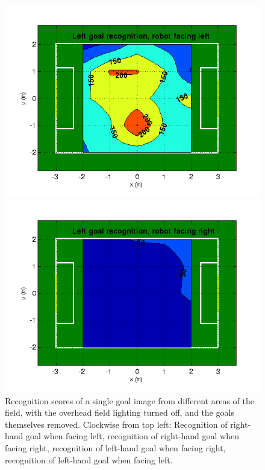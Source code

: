 \documentclass[runningheads,a4paper]{llncs}
\begin{document}
\begin{figure} [h]
\begin{minipage}[b]{0.5\textwidth}
\includegraphics[width=1\textwidth]{figures/LLhard}
\end{minipage}
\begin{minipage}[b]{0.5\textwidth}
\centering
\includegraphics[width=1\textwidth]{figures/LRhard}
\end{minipage}
\caption{Recognition scores of a single goal image from different areas of the field, with the overhead field lighting turned off, and the goals themselves removed. Clockwise from top left: Recognition of right-hand goal when facing left, recognition of right-hand goal when facing right, recognition of left-hand goal when facing right, recognition of left-hand goal when facing left.} \label{fig:heatmaphard}
\end{figure}
\end{document}

